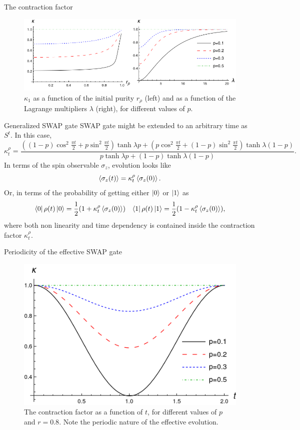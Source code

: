 \begin{frame}{The contraction factor}
    \begin{figure}[h!]
        \centering
        \includegraphics[width=0.9\linewidth]{figures/ContractionFactorSWAP_2D_both.png}
        \caption{$\kappa_{1}$ as a function of the initial purity $r_{\rho}$ (left) and as a function of the Lagrange multipliers $\lambda$ (right), for different values of $p$.}
        \label{fig:SWAPFactor2D}
      \end{figure}
\end{frame}

\begin{frame}{Generalized SWAP gate}
    SWAP gate might be extended to an arbitrary time as $S^{t}$. In this case, 
    \begin{equation*}
        \kappa_{t}^{\rho}=\frac{((1-p)\cos^{2}{\frac{\pi t}{2}}+p\sin^{2}{\frac{\pi t}{2}})\tanh{\lambda p}+(p\cos^{2}{\frac{\pi t}{2}}+(1-p)\sin^{2}{\frac{\pi t}{2}})\tanh{\lambda (1-p)}}{
          p\tanh{\lambda p}+(1-p)\tanh{\lambda (1-p)}}.
      \end{equation*}
      In terms of the spin observable $\sigma_{z}$, evolution looks like
\begin{equation}
  \expval{\sigma_{z}(t)}=\kappa_{t}^{\rho}\expval{\sigma_{z}(0)}.
\end{equation}
Or, in terms of the probability of getting either $\ket{0}$ or $\ket{1}$ as
 \begin{align}
  \bra{0}\rho(t)\ket{0}=\frac{1}{2}(1+\kappa_{t}^{\rho}\expval{\sigma_{z}(0)}) && \bra{1}\rho(t)\ket{1}=\frac{1}{2}(1-\kappa_{t}^{\rho}\expval{\sigma_{z}(0)}),
 \end{align}
 where both non linearity and time dependency is contained inside the contraction factor $\kappa_{t}^{\rho}$. 
\end{frame}

\begin{frame}{Periodicity of the effective SWAP gate}
    \begin{figure}[h!]
        \includegraphics[width=0.5\columnwidth]{figures/ContractionFactorSWAP_z=0.8_t=0_to_t=2.png}%
        \caption{The contraction factor as a function of $t$, for different values of $p$ and $r=0.8$. Note the periodic nature of the effective evolution.}
    \end{figure}
\end{frame}


